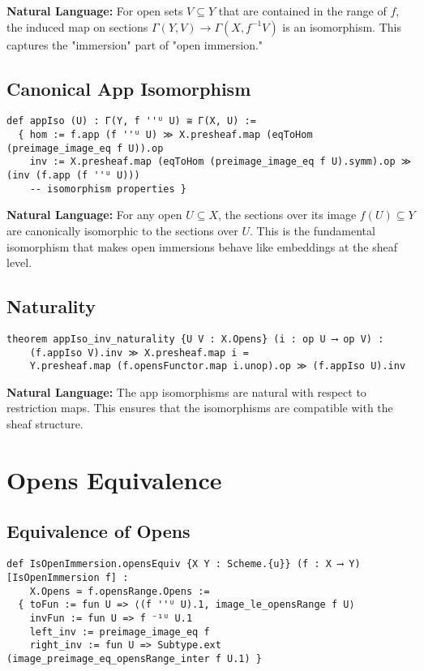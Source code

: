 \documentclass{article}
\theoremstyle{definition}
\begin{document}
\textbf{Natural Language:} For open sets $V \subseteq Y$ that are contained in the range of $f$, the induced map on sections $\Gamma(Y, V) \to \Gamma(X, f^{-1}V)$ is an isomorphism. This captures the "immersion" part of "open immersion."

\subsection{Canonical App Isomorphism}

\begin{lstlisting}
def appIso (U) : Γ(Y, f ''ᵁ U) ≅ Γ(X, U) :=
  { hom := f.app (f ''ᵁ U) ≫ X.presheaf.map (eqToHom (preimage_image_eq f U)).op
    inv := X.presheaf.map (eqToHom (preimage_image_eq f U).symm).op ≫ (inv (f.app (f ''ᵁ U)))
    -- isomorphism properties }
\end{lstlisting}

\textbf{Natural Language:} For any open $U \subseteq X$, the sections over its image $f(U) \subseteq Y$ are canonically isomorphic to the sections over $U$. This is the fundamental isomorphism that makes open immersions behave like embeddings at the sheaf level.

\subsection{Naturality}

\begin{lstlisting}
theorem appIso_inv_naturality {U V : X.Opens} (i : op U ⟶ op V) :
    (f.appIso V).inv ≫ X.presheaf.map i = 
    Y.presheaf.map (f.opensFunctor.map i.unop).op ≫ (f.appIso U).inv
\end{lstlisting}

\textbf{Natural Language:} The app isomorphisms are natural with respect to restriction maps. This ensures that the isomorphisms are compatible with the sheaf structure.

\section{Opens Equivalence}

\subsection{Equivalence of Opens}

\begin{lstlisting}
def IsOpenImmersion.opensEquiv {X Y : Scheme.{u}} (f : X ⟶ Y) [IsOpenImmersion f] :
    X.Opens ≃ f.opensRange.Opens :=
  { toFun := fun U => ⟨(f ''ᵁ U).1, image_le_opensRange f U⟩
    invFun := fun U => f ⁻¹ᵁ U.1
    left_inv := preimage_image_eq f
    right_inv := fun U => Subtype.ext (image_preimage_eq_opensRange_inter f U.1) }
\end{lstlisting}
\end{document}

